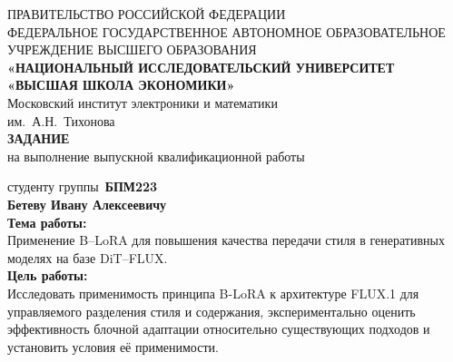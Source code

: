 
\newpage
\pagestyle{empty}
{%
    \begin{center}
        \footnotesize
        ПРАВИТЕЛЬСТВО РОССИЙСКОЙ ФЕДЕРАЦИИ\\[0.3em]
        ФЕДЕРАЛЬНОЕ ГОСУДАРСТВЕННОЕ АВТОНОМНОЕ ОБРАЗОВАТЕЛЬНОЕ\\
        УЧРЕЖДЕНИЕ ВЫСШЕГО ОБРАЗОВАНИЯ\\[0.3em]
        \textbf{«НАЦИОНАЛЬНЫЙ ИССЛЕДОВАТЕЛЬСКИЙ УНИВЕРСИТЕТ\\
        «ВЫСШАЯ ШКОЛА ЭКОНОМИКИ»}\\[0.8em]

        \normalsize
        Московский институт электроники и математики\\
        им.~А.Н.~Тихонова\\[2em]

        \Large\textbf{ЗАДАНИЕ}\\[0.3em]
        \large на выполнение выпускной квалификационной работы\\[1.5em]
    \end{center}

    \normalsize
    \noindent
    студенту группы~\textbf{БПМ223}\\[0.4em]
    \textbf{Бетеву Ивану Алексеевичу}\\[1em]

    \noindent\textbf{Тема работы:}\\[0.3em]
    Применение B–LoRA для повышения качества передачи стиля в
    генеративных моделях на базе DiT–FLUX.\\[1em]

    \noindent\textbf{Цель работы:}\\[0.3em]
    Исследовать применимость принципа B-LoRA к архитектуре FLUX.1 для
    управляемого разделения стиля и содержания, экспериментально оценить
    эффективность блочной адаптации относительно существующих подходов и
    установить условия её применимости.\\[1em]

}
